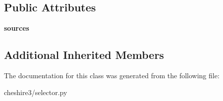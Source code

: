 \subsection*{Public Attributes}
\begin{DoxyCompactItemize}
\item 
\hypertarget{classcheshire3_1_1selector_1_1_x_path_selector_a693205f65dbbb85aea559218019bcba5}{{\bfseries sources}}\label{classcheshire3_1_1selector_1_1_x_path_selector_a693205f65dbbb85aea559218019bcba5}

\end{DoxyCompactItemize}
\subsection*{Additional Inherited Members}


The documentation for this class was generated from the following file\-:\begin{DoxyCompactItemize}
\item 
cheshire3/selector.\-py\end{DoxyCompactItemize}
